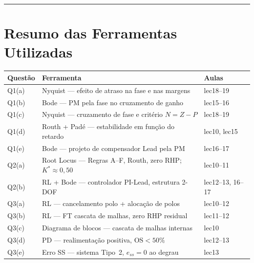 \documentclass[12pt,a4paper]{article}
\begin{document}
\vspace{10pt}\hrule\vspace{10pt}

\section*{Resumo das Ferramentas Utilizadas}

\begin{center}
\begin{tabular}{lll}
\toprule
\textbf{Questão} & \textbf{Ferramenta} & \textbf{Aulas} \\
\midrule
Q1(a) & Nyquist — efeito de atraso na fase e nas margens & lec18--19 \\
Q1(b) & Bode — PM pela fase no cruzamento de ganho & lec15--16 \\
Q1(c) & Nyquist — cruzamento de fase e critério $N = Z - P$ & lec18--19 \\
Q1(d) & Routh + Padé — estabilidade em função do retardo & lec10, lec15 \\
Q1(e) & Bode — projeto de compensador Lead pela PM & lec16--17 \\
Q2(a) & Root Locus — Regras A–F, Routh, zero RHP; $K^* \approx 0{,}50$ & lec10--11 \\
Q2(b) & RL + Bode — controlador PI-Lead, estrutura 2-DOF & lec12--13, 16--17 \\
Q3(a) & RL — cancelamento polo + alocação de polos & lec10--12 \\
Q3(b) & RL — FT cascata de malhas, zero RHP residual & lec11--12 \\
Q3(c) & Diagrama de blocos — cascata de malhas internas & lec10 \\
Q3(d) & PD — realimentação positiva, $\text{OS}<50\%$ & lec12--13 \\
Q3(e) & Erro SS — sistema Tipo~2, $e_{ss}=0$ ao degrau & lec13 \\
\bottomrule
\end{tabular}
\end{center}
\end{document}
